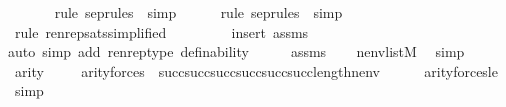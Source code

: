\begin{isabellebody}
\ \ \ \ \ \isamarkupfalse%
\ {\isacharparenleft}{\kern0pt}{\isacharparenleft}{\kern0pt}rule\ sep{\isacharunderscore}{\kern0pt}rules\ {\isacharbar}{\kern0pt}\ simp{\isacharparenright}{\kern0pt}{\isacharparenright}{\kern0pt}\isanewline
\ \ \ \ \isamarkupfalse%
\ {\isacharparenleft}{\kern0pt}{\isacharparenleft}{\kern0pt}rule\ sep{\isacharunderscore}{\kern0pt}rules\ {\isacharbar}{\kern0pt}\ simp{\isacharparenright}{\kern0pt}{\isacharparenright}{\kern0pt}\isanewline
\ \ \ \isamarkupfalse%
\ {\isacharparenleft}{\kern0pt}rule\ renrep{\isacharunderscore}{\kern0pt}sats{\isacharbrackleft}{\kern0pt}simplified{\isacharbrackright}{\kern0pt}{\isacharparenright}{\kern0pt}\isanewline
\ \ \ \ \ \ \ \isamarkupfalse%
\ {\isacharparenleft}{\kern0pt}insert\ assms{\isacharparenright}{\kern0pt}\isanewline
\ \ \ \ \ \ \ \isamarkupfalse%
{\isacharparenleft}{\kern0pt}auto\ simp\ add{\isacharcolon}{\kern0pt}\ renrep{\isacharunderscore}{\kern0pt}type\ definability{\isacharparenright}{\kern0pt}\isanewline
{}\isamarkupfalse%
\ {\isacharminus}{\kern0pt}\isanewline
\ \ \isamarkupfalse%
\ assms\isanewline
\ \ \isamarkupfalse%
\ {\isachardoublequoteopen}nenv{\isasymin}list{\isacharparenleft}{\kern0pt}M{\isacharparenright}{\kern0pt}{\isachardoublequoteclose}\ \isamarkupfalse%
\ simp\isanewline
\ \ \isamarkupfalse%
\ {\isacartoucheopen}arity{\isacharparenleft}{\kern0pt}{\isasymphi}{\isacharparenright}{\kern0pt}{\isasymle}{\isacharunderscore}{\kern0pt}{\isacartoucheclose}\ {\isacartoucheopen}{\isasymphi}{\isasymin}{\isacharunderscore}{\kern0pt}{\isacartoucheclose}\isanewline
\ \ \isamarkupfalse%
\ {\isachardoublequoteopen}arity{\isacharparenleft}{\kern0pt}forces{\isacharparenleft}{\kern0pt}{\isasymphi}{\isacharparenright}{\kern0pt}{\isacharparenright}{\kern0pt}\ {\isasymle}\ succ{\isacharparenleft}{\kern0pt}succ{\isacharparenleft}{\kern0pt}succ{\isacharparenleft}{\kern0pt}succ{\isacharparenleft}{\kern0pt}succ{\isacharparenleft}{\kern0pt}succ{\isacharparenleft}{\kern0pt}length{\isacharparenleft}{\kern0pt}nenv{\isacharparenright}{\kern0pt}{\isacharparenright}{\kern0pt}{\isacharparenright}{\kern0pt}{\isacharparenright}{\kern0pt}{\isacharparenright}{\kern0pt}{\isacharparenright}{\kern0pt}{\isacharparenright}{\kern0pt}{\isachardoublequoteclose}\isanewline
\ \ \ \ \isamarkupfalse%
\ arity{\isacharunderscore}{\kern0pt}forces{\isacharunderscore}{\kern0pt}le\ \isamarkupfalse%
\ simp\isanewline

\end{isabellebody}
